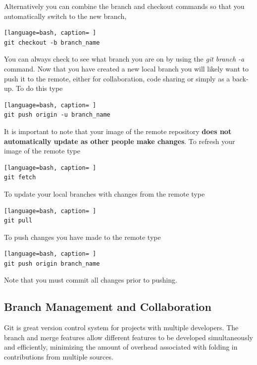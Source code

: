 \noindent
Alternatively you can combine the branch and checkout commands so that you automatically switch to the new branch,

\begin{lstlisting}[language=bash, caption= ]
git checkout -b branch_name
\end{lstlisting}

\noindent
You can always check to see what branch you are on by using the \textit{git branch -a} command. Now that you have created a new local branch you will likely want to push it to the remote, either for collaboration, code sharing or simply as a back-up. To do this type

\begin{lstlisting}[language=bash, caption= ]
git push origin -u branch_name
\end{lstlisting}

\noindent
It is important to note that your image of the remote repository \textbf{does not automatically update as other people make changes}. To refresh your image of the remote type

\begin{lstlisting}[language=bash, caption= ]
git fetch
\end{lstlisting}

\noindent
To update your local branches with changes from the remote type

\begin{lstlisting}[language=bash, caption= ]
git pull
\end{lstlisting}

\noindent
To push changes you have made to the remote type

\begin{lstlisting}[language=bash, caption= ]
git push origin branch_name
\end{lstlisting}

\noindent
Note that you must commit all changes prior to pushing.

\subsection{Branch Management and Collaboration}

Git is great version control system for projects with multiple developers. The branch and merge features allow different features to be developed simultaneously and efficiently, minimizing the amount of overhead associated with folding in contributions from multiple sources. \\

